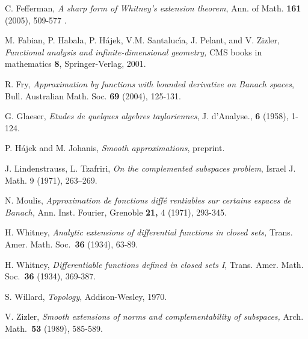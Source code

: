 \documentclass[11pt]{amsproc}%
\theoremstyle{plain}
\numberwithin{equation}{section}
\begin{document}
\begin{thebibliography}{999999}
C. Fefferman, \textit{A sharp form of Whitney's extension
theorem}, Ann. of Math. \textbf{161 }(2005), 509-577 .

M. Fabian, P. Habala, P. H{{\'a}}jek, V.M.
Santaluc{{\'\i}}a, J. Pelant, and V. Zizler, \textit{Functional analysis and
infinite-dimensional geometry, }CMS books in mathematics \textbf{8},
Springer-Verlag, 2001.

R. Fry, \textit{Approximation by functions with bounded
derivative on Banach spaces}, Bull. Australian Math. Soc. \textbf{69} (2004), 125-131.

G. Glaeser, \textit{Etudes de quelques algebres tayloriennes},
J. d'Analyse., \textbf{6 }(1958), 1-124.

P. H{\'a}jek and M. Johanis, \textit{Smooth approximations}, preprint.

J. Lindenstrauss, L. Tzafriri, \emph{On the complemented
subspaces problem}, Israel J. Math. 9 (1971), 263--269.

N. Moulis, \textit{Approximation de fonctions diff{{\'e}%
}rentiables sur certains espaces de Banach,} Ann. Inst. Fourier, Grenoble
\textbf{21, }4 (1971), 293-345.

H. Whitney, \textit{Analytic extensions of differential
functions in closed sets,} Trans. Amer. Math. Soc.\textit{\ }\textbf{36 }
(1934), 63-89.

H. Whitney, \textit{Differentiable functions defined in closed
sets I}, Trans. Amer. Math. Soc.\textit{\ }\textbf{36 } (1934), 369-387.

S. Willard, \textit{Topology}, Addison-Wesley, 1970.

V. Zizler, \textit{Smooth extensions of norms and
complementability of subspaces,} Arch. Math.\textit{\ }\textbf{53 }(1989), 585-589.
\end{thebibliography}
\end{document}
